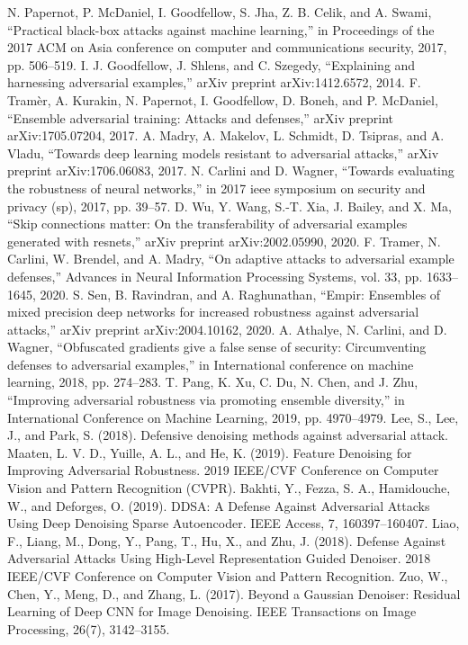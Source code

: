 \documentclass[10pt,journal,compsoc]{IEEEtran}
\begin{document}
% 
%
\begin{thebibliography}{}
  N. Papernot, P. McDaniel, I. Goodfellow, S. Jha, Z. B. Celik, and A. Swami, “Practical black-box attacks against machine learning,” in Proceedings of the 2017 ACM on Asia conference on computer and communications security, 2017, pp. 506–519.
  I. J. Goodfellow, J. Shlens, and C. Szegedy, “Explaining and harnessing adversarial examples,” arXiv preprint arXiv:1412.6572, 2014.
  F. Tramèr, A. Kurakin, N. Papernot, I. Goodfellow, D. Boneh, and P. McDaniel, “Ensemble adversarial training: Attacks and defenses,” arXiv preprint arXiv:1705.07204, 2017.
  A. Madry, A. Makelov, L. Schmidt, D. Tsipras, and A. Vladu, “Towards deep learning models resistant to adversarial attacks,” arXiv preprint arXiv:1706.06083, 2017.
  N. Carlini and D. Wagner, “Towards evaluating the robustness of neural networks,” in 2017 ieee symposium on security and privacy (sp), 2017, pp. 39–57.
  D. Wu, Y. Wang, S.-T. Xia, J. Bailey, and X. Ma, “Skip connections matter: On the transferability of adversarial examples generated with resnets,” arXiv preprint arXiv:2002.05990, 2020.
  F. Tramer, N. Carlini, W. Brendel, and A. Madry, “On adaptive attacks to adversarial example defenses,” Advances in Neural Information Processing Systems, vol. 33, pp. 1633–1645, 2020.
  S. Sen, B. Ravindran, and A. Raghunathan, “Empir: Ensembles of mixed precision deep networks for increased robustness against adversarial attacks,” arXiv preprint arXiv:2004.10162, 2020.
  A. Athalye, N. Carlini, and D. Wagner, “Obfuscated gradients give a false sense of security: Circumventing defenses to adversarial examples,” in International conference on machine learning, 2018, pp. 274–283.
  T. Pang, K. Xu, C. Du, N. Chen, and J. Zhu, “Improving adversarial robustness via promoting ensemble diversity,” in International Conference on Machine Learning, 2019, pp. 4970–4979.
  Lee, S., Lee, J., and Park, S. (2018). Defensive denoising methods against adversarial attack. 
  Maaten, L. V. D., Yuille, A. L., and He, K. (2019). Feature Denoising for Improving Adversarial Robustness. 2019 IEEE/CVF Conference on Computer Vision and Pattern Recognition (CVPR).
  Bakhti, Y., Fezza, S. A., Hamidouche, W., and Deforges, O. (2019). DDSA: A Defense Against Adversarial Attacks Using Deep Denoising Sparse Autoencoder. IEEE Access, 7, 160397–160407.
  Liao, F., Liang, M., Dong, Y., Pang, T., Hu, X., and Zhu, J. (2018). Defense Against Adversarial Attacks Using High-Level Representation Guided Denoiser. 2018 IEEE/CVF Conference on Computer Vision and Pattern Recognition.
  Zuo, W., Chen, Y., Meng, D., and Zhang, L. (2017). Beyond a Gaussian Denoiser: Residual Learning of Deep CNN for Image Denoising. IEEE Transactions on Image Processing, 26(7), 3142–3155.
 
 
\end{thebibliography}
\end{document}
